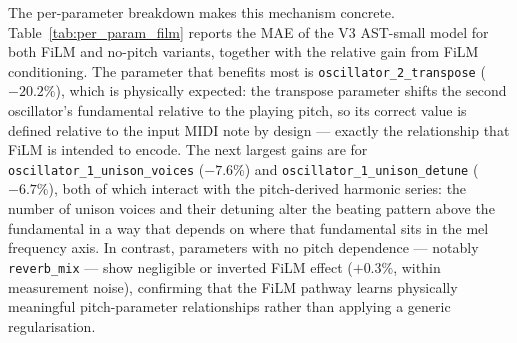 \noindent \newline
The per-parameter breakdown makes this mechanism concrete. Table~\ref{tab:per_param_film} reports the MAE of the V3 AST-small model for both FiLM and no-pitch variants, together with the relative gain from FiLM conditioning. The parameter that benefits most is \texttt{oscillator\_2\_transpose} ($-20.2\%$), which is physically expected: the transpose parameter shifts the second oscillator's fundamental relative to the playing pitch, so its correct value is defined relative to the input MIDI note by design — exactly the relationship that FiLM is intended to encode. The next largest gains are for \texttt{oscillator\_1\_unison\_voices} ($-7.6\%$) and \texttt{oscillator\_1\_unison\_detune} ($-6.7\%$), both of which interact with the pitch-derived harmonic series: the number of unison voices and their detuning alter the beating pattern above the fundamental in a way that depends on where that fundamental sits in the mel frequency axis. In contrast, parameters with no pitch dependence — notably \texttt{reverb\_mix} — show negligible or inverted FiLM effect ($+0.3\%$, within measurement noise), confirming that the FiLM pathway learns physically meaningful pitch-parameter relationships rather than applying a generic regularisation.


